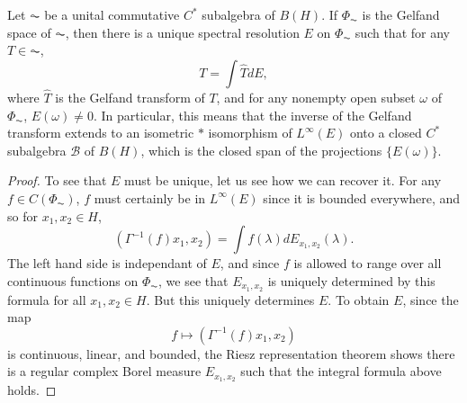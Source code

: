 \begin{theorem}
    Let $\AC$ be a unital commutative $C^*$ subalgebra of $B(H)$. If $\Phi_{\AC}$ is the Gelfand space of $\AC$, then there is a unique spectral resolution $E$ on $\Phi_{\AC}$ such that for any $T \in \AC$,
    \[ T = \int \widehat{T} dE, \]
    where $\widehat{T}$ is the Gelfand transform of $T$, and for any nonempty open subset $\omega$ of $\Phi_{\AC}$, $E(\omega) \neq 0$. In particular, this means that the inverse of the Gelfand transform extends to an isometric $*$ isomorphism of $L^\infty(E)$ onto a closed $C^*$ subalgebra $\mathcal{B}$ of $B(H)$, which is the closed span of the projections $\{ E(\omega) \}$.
\end{theorem}
\begin{proof}
    To see that $E$ must be unique, let us see how we can recover it. For any $f \in C(\Phi_{\AC})$, $f$ must certainly be in $L^\infty(E)$ since it is bounded everywhere, and so for $x_1,x_2 \in H$,
    \[ ( \Gamma^{-1}(f) x_1, x_2) = \int f(\lambda) dE_{x_1,x_2}(\lambda). \]
    The left hand side is independant of $E$, and since $f$ is allowed to range over all continuous functions on $\Phi_{\AC}$, we see that $E_{x_1,x_2}$ is uniquely determined by this formula for all $x_1,x_2 \in H$. But this uniquely determines $E$. To obtain $E$, since the map
    \[ f \mapsto (\Gamma^{-1}(f) x_1, x_2) \]
    is continuous, linear, and bounded, the Riesz representation theorem shows there is a regular complex Borel measure $E_{x_1,x_2}$ such that the integral formula above holds.


\end{proof}
